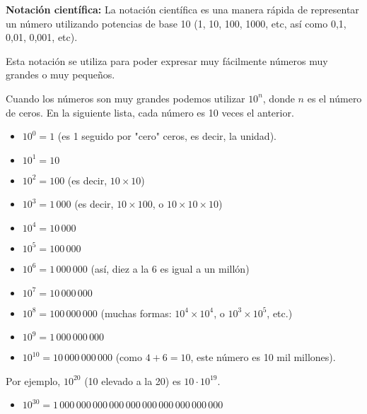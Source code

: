 \documentclass[12pt,a4paper]{article}
\begin{document}

\begin{tcolorbox}[colback=fondorosa,colframe=rojoclaro,title=\textbf{Mini Explicación: Identificando la notación científica},fonttitle=\bfseries,breakable]

\textbf{Notación científica:} La notación científica es una manera rápida de representar un número utilizando potencias de base 10 (1, 10, 100, 1000, etc, así como 0,1, 0,01, 0,001, etc).

Esta notación se utiliza para poder expresar muy fácilmente números muy grandes o muy pequeños.

\vspace{0.5cm}

Cuando los números son muy grandes podemos utilizar $10^n$, donde $n$ es el número de ceros. En la siguiente lista, cada número es 10 veces el anterior.

\begin{itemize}
\item $10^0 = 1$ (es 1 seguido por "cero" ceros, es decir, la unidad).
\item $10^1 = 10$
\item $10^2 = 100$ (es decir, $10 \times 10$)
\item $10^3 = 1\,000$ (es decir, $10 \times 100$, o $10 \times 10 \times 10$)
\item $10^4 = 10\,000$
\item $10^5 = 100\,000$
\item $10^6 = 1\,000\,000$ (así, diez a la 6 es igual a un millón)
\item $10^7 = 10\,000\,000$
\item $10^8 = 100\,000\,000$ (muchas formas: $10^4 \times 10^4$, o $10^3 \times 10^5$, etc.)
\item $10^9 = 1\,000\,000\,000$
\item $10^{10} = 10\,000\,000\,000$ (como $4+6=10$, este número es 10 mil millones).
\end{itemize}

Por ejemplo, $10^{20}$ (10 elevado a la 20) es $10 \cdot 10^{19}$.

\begin{itemize}
\item $10^{30} = 1\,000\,000\,000\,000\,000\,000\,000\,000\,000\,000$
\end{itemize}

\vspace{0.5cm}


\end{tcolorbox}
\end{document}
